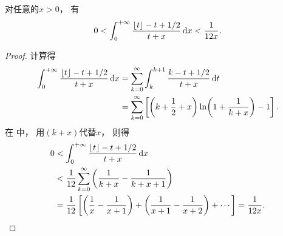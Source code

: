 \begin{lemma}\label{theorem:定积分.伽马函数的斯特灵近似.引理2}
对任意的\(x>0\)，
有\begin{equation}\label{equation:定积分.伽马函数的斯特灵近似.引理2}
	0 < \int_0^{+\infty} \frac{\lfloor t\rfloor - t + 1/2}{t + x} \dd{x} < \frac{1}{12 x}.
\end{equation}
\begin{proof}
计算得\begin{align*}
	\int_0^{+\infty} \frac{\lfloor t\rfloor - t + 1/2}{t + x} \dd{x}
	&= \sum_{k=0}^\infty \int_k^{k+1} \frac{k - t + 1/2}{t + x} \dd{t} \\
	&= \sum_{k=0}^\infty \left[
	\left(k + \frac{1}{2} + x\right) \ln(1 + \frac{1}{k + x}) - 1
	\right].
\end{align*}
在  中，
用\((k+x)\)代替\(x\)，
则得\begin{align*}
	0 &< \int_0^{+\infty} \frac{\lfloor t\rfloor - t + 1/2}{t + x} \dd{x} \\
	&< \frac{1}{12} \sum_{k=0}^\infty \left(\frac{1}{k+x}
		- \frac{1}{k+x+1}\right) \\
	&= \frac{1}{12} \left[
		\left(\frac{1}{x} - \frac{1}{x+1}\right)
		+ \left(\frac{1}{x+1} - \frac{1}{x+2}\right) + \dotsb
	\right]
	= \frac{1}{12x}.
	\qedhere
\end{align*}
\end{proof}
\end{lemma}

